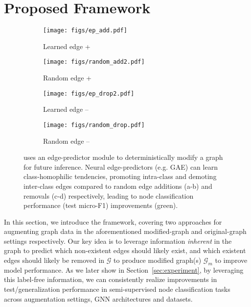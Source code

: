 \documentclass[letterpaper]{article} \usepackage{aaai21}  \usepackage{times}  \usepackage{helvet} \usepackage{courier}  \usepackage[hyphens]{url}  \usepackage{graphicx} \urlstyle{rm} \def\UrlFont{\rm}  \usepackage{natbib}  \usepackage{caption} \frenchspacing  \setlength{\pdfpagewidth}{8.5in}  \setlength{\pdfpageheight}{11in}
\begin{document}
\section{Proposed \methodshared Framework}
\label{sec:proposedmethod}
\begin{figure}[t]
    \centering
        \begin{subfigure}[b]{.43\linewidth}
          \texttt{[image: figs/ep\_add.pdf]}
          \caption{Learned edge +}\label{fig:}
        \end{subfigure}
\begin{subfigure}[b]{.43\linewidth}
          \texttt{[image: figs/random\_add2.pdf]}
             \caption{Random edge +}\label{fig:}
        \end{subfigure}
\begin{subfigure}[b]{.43\linewidth}
            \texttt{[image: figs/ep\_drop2.pdf]}
            \caption{Learned edge -- }\label{fig:}
        \end{subfigure}
\begin{subfigure}[b]{.43\linewidth}
            \texttt{[image: figs/random\_drop.pdf]}
            \caption{Random edge --}\label{fig:}
        \end{subfigure}
    \caption{\label{fig:2step} \methodtwo uses an edge-predictor module to deterministically modify a graph for future inference. Neural edge-predictors (e.g. GAE) can learn class-homophilic tendencies, promoting intra-class and demoting inter-class edges compared to random edge additions (a-b) and removals (c-d) respectively, leading to node classification performance (test micro-F1) improvements (green).}
\end{figure}



In this section, we introduce the \methodshared framework, covering two approaches for augmenting graph data in the aforementioned modified-graph and original-graph settings respectively.  Our key idea is to leverage information \emph{inherent} in the graph to predict which non-existent edges should likely exist, and which existent edges should likely be removed in $\mathcal{G}$ to produce modified graph(s) $\mathcal{G}_m$ to improve model performance.  As we later show in Section~\ref{sec:experiment}, by leveraging this label-free information, we can consistently realize improvements in test/generalization performance in semi-supervised node classification tasks across augmentation settings, GNN architectures and datasets.   
\end{document}
